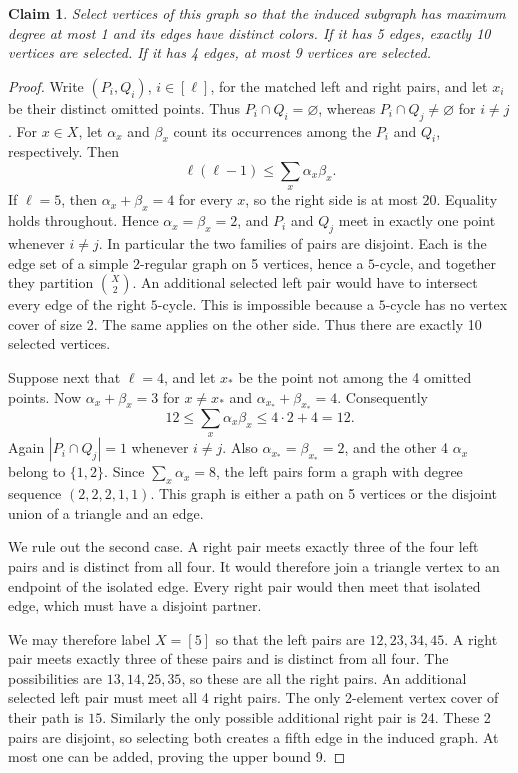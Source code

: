 \documentclass[10pt]{article}
\numberwithin{equation}{section}
\newtheorem{claim}[claim]{Claim}
\theoremstyle{definition}
\begin{document}
\begin{claim}\label{clm:five-pair-observation}
Select vertices of this graph so that the induced subgraph has maximum degree at most 1 and its edges have distinct colors. If it has 5 edges, exactly 10 vertices are selected. If it has 4 edges, at most 9 vertices are selected.
\end{claim}
\begin{proof}
Write $(P_i,Q_i)$, $i\in[\ell]$, for the matched left and right pairs, and let $x_i$ be their distinct omitted points. Thus $P_i\cap Q_i=\varnothing$, whereas $P_i\cap Q_j\ne\varnothing$ for $i\ne j$. For $x\in X$, let $\alpha_x$ and $\beta_x$ count its occurrences among the $P_i$ and $Q_i$, respectively. Then
\[
 \ell(\ell-1)\le\sum_x\alpha_x\beta_x.
\]
If $\ell=5$, then $\alpha_x+\beta_x=4$ for every $x$, so the right side is at most $20$. Equality holds throughout. Hence $\alpha_x=\beta_x=2$, and $P_i$ and $Q_j$ meet in exactly one point whenever $i\ne j$. In particular the two families of pairs are disjoint. Each is the edge set of a simple $2$-regular graph on 5 vertices, hence a $5$-cycle, and together they partition $\binom X2$. An additional selected left pair would have to intersect every edge of the right $5$-cycle. This is impossible because a $5$-cycle has no vertex cover of size 2. The same applies on the other side. Thus there are exactly 10 selected vertices.

Suppose next that $\ell=4$, and let $x_*$ be the point not among the 4 omitted points. Now $\alpha_x+\beta_x=3$ for $x\ne x_*$ and $\alpha_{x_*}+\beta_{x_*}=4$. Consequently
\[
 12\le\sum_x\alpha_x\beta_x\le4\cdot2+4=12.
\]
Again $|P_i\cap Q_j|=1$ whenever $i\ne j$. Also $\alpha_{x_*}=\beta_{x_*}=2$, and the other 4 $\alpha_x$ belong to $\{1,2\}$. Since $\sum_x\alpha_x=8$, the left pairs form a graph with degree sequence $(2,2,2,1,1)$. This graph is either a path on 5 vertices or the disjoint union of a triangle and an edge.

We rule out the second case. A right pair meets exactly three of the four left pairs and is distinct from all four. It would therefore join a triangle vertex to an endpoint of the isolated edge. Every right pair would then meet that isolated edge, which must have a disjoint partner.

We may therefore label $X=[5]$ so that the left pairs are $12,23,34,45$. A right pair meets exactly three of these pairs and is distinct from all four. The possibilities are $13,14,25,35$, so these are all the right pairs. An additional selected left pair must meet all 4 right pairs. The only 2-element vertex cover of their path is $15$. Similarly the only possible additional right pair is $24$. These 2 pairs are disjoint, so selecting both creates a fifth edge in the induced graph. At most one can be added, proving the upper bound 9.
\end{proof}
\end{document}
